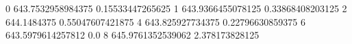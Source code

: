 0 643.7532958984375 0.15533447265625
1 643.9366455078125 0.33868408203125
2 644.1484375 0.55047607421875
4 643.825927734375 0.22796630859375
6 643.5979614257812 0.0
8 645.9761352539062 2.378173828125
